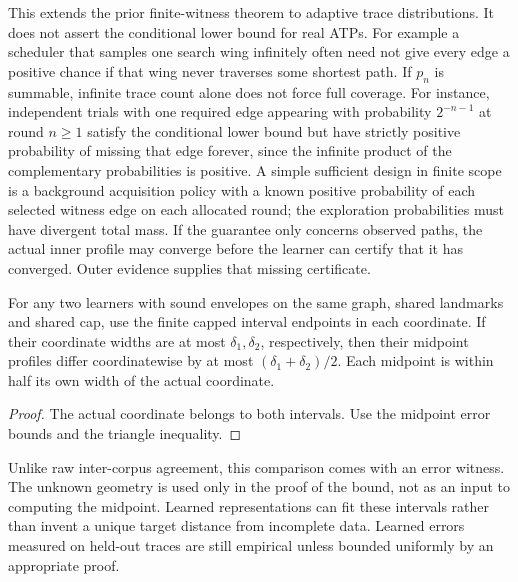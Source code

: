 \documentclass[11pt]{article}
\theoremstyle{definition}\newtheorem{definition}[theorem]{Definition}\newtheorem{example}[theorem]{Example}\newtheorem{conjecture}[theorem]{Conjecture}
\begin{document}
This extends the prior finite-witness theorem to adaptive trace distributions. It does not assert the conditional lower bound for real ATPs. For example a scheduler that samples one search wing infinitely often need not give every edge a positive chance if that wing never traverses some shortest path. If $p_n$ is summable, infinite trace count alone does not force full coverage. For instance, independent trials with one required edge appearing with probability $2^{-n-1}$ at round $n\ge1$ satisfy the conditional lower bound but have strictly positive probability of missing that edge forever, since the infinite product of the complementary probabilities is positive. A simple sufficient design in finite scope is a background acquisition policy with a known positive probability of each selected witness edge on each allocated round; the exploration probabilities must have divergent total mass. If the guarantee only concerns observed paths, the actual inner profile may converge before the learner can certify that it has converged. Outer evidence supplies that missing certificate.
\begin{corollary}
For any two learners with sound envelopes on the same graph, shared landmarks and shared cap, use the finite capped interval endpoints in each coordinate. If their coordinate widths are at most $\delta_1,\delta_2$, respectively, then their midpoint profiles differ coordinatewise by at most $(\delta_1+\delta_2)/2$. Each midpoint is within half its own width of the actual coordinate.\end{corollary}
\begin{proof} The actual coordinate belongs to both intervals. Use the midpoint error bounds and the triangle inequality.\end{proof}
Unlike raw inter-corpus agreement, this comparison comes with an error witness. The unknown geometry is used only in the proof of the bound, not as an input to computing the midpoint. Learned representations can fit these intervals rather than invent a unique target distance from incomplete data. Learned errors measured on held-out traces are still empirical unless bounded uniformly by an appropriate proof.
\end{document}
